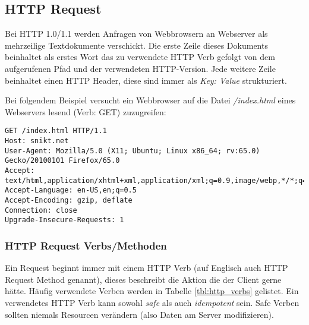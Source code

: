 \subsection{HTTP Request}

Bei HTTP 1.0/1.1 werden Anfragen von Webbrowsern an Webserver als mehrzeilige Textdokumente verschickt. Die erste Zeile dieses Dokuments beinhaltet als erstes Wort das zu verwendete HTTP Verb gefolgt von dem aufgerufenen Pfad und der verwendeten HTTP-Version. Jede weitere Zeile beinhaltet einen HTTP Header, diese sind immer als \textit{Key: Value} strukturiert.

Bei folgendem Beispiel versucht ein Webbrowser auf die Datei \textit{/index.html} eines Webservers lesend (Verb: GET) zuzugreifen:

\begin{verbatim}
GET /index.html HTTP/1.1
Host: snikt.net
User-Agent: Mozilla/5.0 (X11; Ubuntu; Linux x86_64; rv:65.0) Gecko/20100101 Firefox/65.0
Accept: text/html,application/xhtml+xml,application/xml;q=0.9,image/webp,*/*;q=0.8
Accept-Language: en-US,en;q=0.5
Accept-Encoding: gzip, deflate
Connection: close
Upgrade-Insecure-Requests: 1
\end{verbatim}

\subsubsection{HTTP Request Verbs/Methoden}

Ein Request beginnt immer mit einem HTTP Verb (auf Englisch auch HTTP Request Method genannt), dieses beschreibt die Aktion die der Client gerne hätte. Häufig verwendete Verben werden in Tabelle \ref{tbl:http_verbs} gelistet. Ein verwendetes HTTP Verb kann sowohl \textit{safe} als auch \textit{idempotent} sein. Safe Verben sollten niemals Resourcen verändern (also Daten am Server modifizieren).

